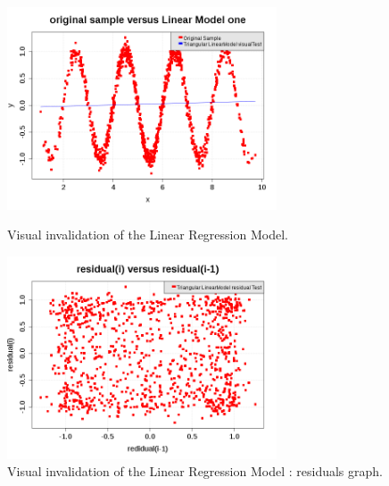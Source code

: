                  \begin{figure}[H]
                   \begin{minipage}{8cm}
                     \begin{center}
                       \includegraphics[width=8cm]{Figures/linearRegression_GraphWrong2.png}
                       \caption{Visual invalidation of the Linear Regression Model.}
                       \label{LMWrong2}
                     \end{center}
                   \end{minipage}
                   \hfill
                   \begin{minipage}{8cm}
                     \begin{center}
                       \includegraphics[width=8cm]{Figures/linearRegression_residualGraphWrong2.png}
                       \caption{Visual invalidation of the Linear Regression Model : residuals graph.}
                       \label{LMResidualWrong2}
                     \end{center}
                   \end{minipage}
                 \end{figure}
